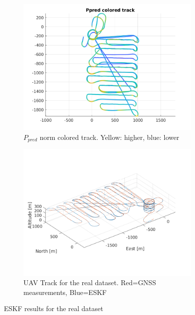\begin{figure}
        \begin{subfigure}[b]{0.49\textwidth}
                \includegraphics[width=\textwidth]{plots/a2-real-ppred-colored-track}
                \caption{$P_{pred}$ norm colored track. Yellow: higher, blue: lower}
                \label{fig:eskf-real-ppred-coloredtrack}
        \end{subfigure}
        \hfill
        \begin{subfigure}[b]{0.49\textwidth}
                \includegraphics[width=\textwidth]{plots/a2-real-track}
                \caption{UAV Track for the real dataset. Red=GNSS measurements, Blue=ESKF}
                \label{fig:eskf-real-track}
        \end{subfigure}
        \caption{ESKF results for the real dataset}
\end{figure}

